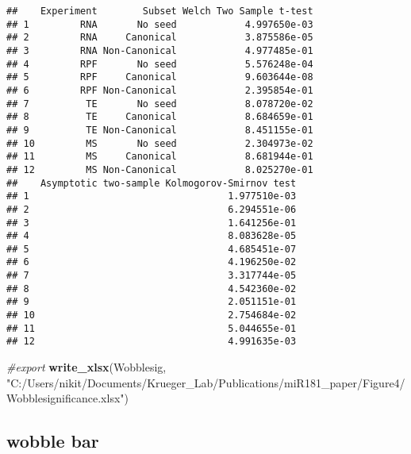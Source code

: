 \documentclass[
]{article}
\newenvironment{Shaded}{\begin{snugshade}}{\end{snugshade}}
\newcommand{\AttributeTok}[1]{\textcolor[rgb]{0.13,0.29,0.53}{#1}}
\newcommand{\CommentTok}[1]{\textcolor[rgb]{0.56,0.35,0.01}{\textit{#1}}}
\newcommand{\FunctionTok}[1]{\textcolor[rgb]{0.13,0.29,0.53}{\textbf{#1}}}
\newcommand{\NormalTok}[1]{#1}
\newcommand{\OtherTok}[1]{\textcolor[rgb]{0.56,0.35,0.01}{#1}}
\newcommand{\SpecialCharTok}[1]{\textcolor[rgb]{0.81,0.36,0.00}{\textbf{#1}}}
\newcommand{\StringTok}[1]{\textcolor[rgb]{0.31,0.60,0.02}{#1}}
\begin{document}
\begin{verbatim}
##    Experiment        Subset Welch Two Sample t-test
## 1         RNA       No seed            4.997650e-03
## 2         RNA     Canonical            3.875586e-05
## 3         RNA Non-Canonical            4.977485e-01
## 4         RPF       No seed            5.576248e-04
## 5         RPF     Canonical            9.603644e-08
## 6         RPF Non-Canonical            2.395854e-01
## 7          TE       No seed            8.078720e-02
## 8          TE     Canonical            8.684659e-01
## 9          TE Non-Canonical            8.451155e-01
## 10         MS       No seed            2.304973e-02
## 11         MS     Canonical            8.681944e-01
## 12         MS Non-Canonical            8.025270e-01
##    Asymptotic two-sample Kolmogorov-Smirnov test
## 1                                   1.977510e-03
## 2                                   6.294551e-06
## 3                                   1.641256e-01
## 4                                   8.083628e-05
## 5                                   4.685451e-07
## 6                                   4.196250e-02
## 7                                   3.317744e-05
## 8                                   4.542360e-02
## 9                                   2.051151e-01
## 10                                  2.754684e-02
## 11                                  5.044655e-01
## 12                                  4.991635e-03
\end{verbatim}

\begin{Shaded}
\begin{Highlighting}[]
\CommentTok{\#export}
\FunctionTok{write\_xlsx}\NormalTok{(Wobblesig, }\StringTok{"C:/Users/nikit/Documents/Krueger\_Lab/Publications/miR181\_paper/Figure4/Wobblesignificance.xlsx"}\NormalTok{)}
\end{Highlighting}
\end{Shaded}

\hypertarget{wobble-bar}{%
\subsection{wobble bar}\label{wobble-bar}}

\begin{Shaded}
\end{Shaded}
\end{document}
